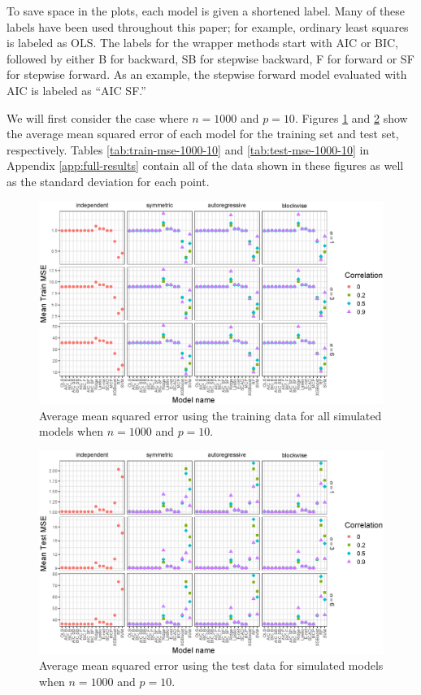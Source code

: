\documentclass{article}
\begin{document}
To save space in the plots, each model is given a shortened label. Many of these labels have been used throughout this paper; for example, ordinary least squares is labeled as OLS. The labels for the wrapper methods start with AIC or BIC, followed by either B for backward, SB for stepwise backward, F for forward or SF for stepwise forward. As an example, the stepwise forward model evaluated with AIC is labeled as ``AIC SF.''

We will first consider the case where $n = 1000$ and $p = 10$. Figures \ref{fig:train-mse-1000-10} and \ref{fig:test-mse-1000-10} show the average mean squared error of each model for the training set and test set, respectively. Tables \ref{tab:train-mse-1000-10} and \ref{tab:test-mse-1000-10} in Appendix \ref{app:full-results} contain all of the data shown in these figures as well as the standard deviation for each point.

\begin{figure}[h!]
	\centering
	\includegraphics[width = \textwidth]{images/facet-train-mse/facet_train_mse_1000_10.eps}
	\captionsetup{width = 0.8\textwidth}
	\caption{Average mean squared error using the training data for all simulated models when $n = 1000$ and $p = 10$.}
	\label{fig:train-mse-1000-10}
\end{figure}

\begin{figure}[h!]
	\centering
	\includegraphics[width = \textwidth]{images/facet-test-mse/facet_test_mse_1000_10.eps}
	\captionsetup{width = 0.8\textwidth}
	\caption{Average mean squared error using the test data for simulated models when $n = 1000$ and $p = 10$.}
	\label{fig:test-mse-1000-10}
\end{figure}
\end{document}
